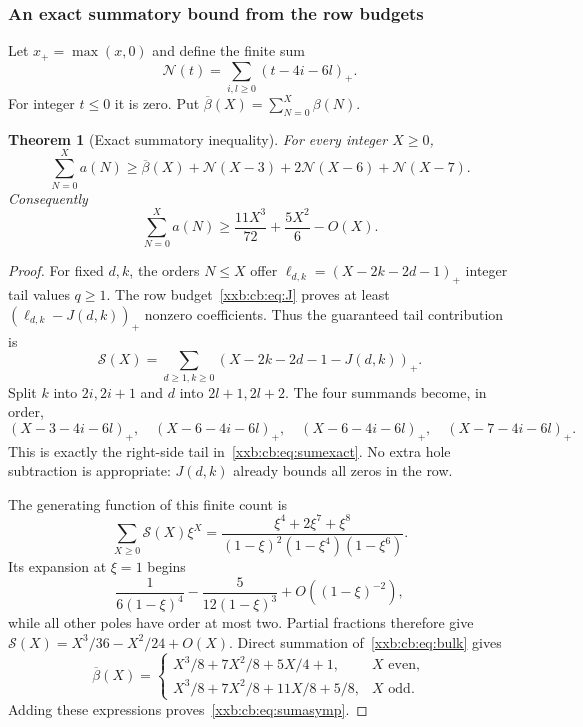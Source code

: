 \documentclass[11pt,a4paper]{article}
\numberwithin{equation}{section}
\newtheorem{theorem}{Theorem}[section]
\theoremstyle{definition}
\theoremstyle{remark}
\theoremstyle{plain}
\begin{document}
\subsubsection{An exact summatory bound from the row budgets}

Let $x_+=\max(x,0)$ and define the finite sum
\begin{equation}\label{xxb:cb:eq:F}
 \mathcal N(t)=\sum_{i,l\ge0}(t-4i-6l)_+.
\end{equation}
For integer $t\le0$ it is zero. Put $\overline\beta(X)=\sum_{N=0}^X\beta(N)$.

\begin{theorem}[Exact summatory inequality]\label{xxb:cb:thm:sum}
For every integer $X\ge0$,
\begin{equation}\label{xxb:cb:eq:sumexact}
 \sum_{N=0}^Xa(N)\ge\overline\beta(X)+\mathcal N(X-3)+2\mathcal N(X-6)+\mathcal N(X-7).
\end{equation}
Consequently
\begin{equation}\label{xxb:cb:eq:sumasymp}
 \sum_{N=0}^Xa(N)\ge\frac{11X^3}{72}+\frac{5X^2}{6}-O(X).
\end{equation}
\end{theorem}
\begin{proof}
For fixed $d,k$, the orders $N\le X$ offer
$\ell_{d,k}=(X-2k-2d-1)_+$ integer tail values $q\ge1$. The row
budget~\eqref{xxb:cb:eq:J} proves at least $(\ell_{d,k}-J(d,k))_+$ nonzero
coefficients. Thus the guaranteed tail contribution is
\[
 \mathcal S(X)=\sum_{d\ge1,k\ge0}(X-2k-2d-1-J(d,k))_+.
\]
Split $k$ into $2i,2i+1$ and $d$ into $2l+1,2l+2$. The four summands become, in
order,
\[
 (X-3-4i-6l)_+,\quad (X-6-4i-6l)_+,\quad
 (X-6-4i-6l)_+,\quad (X-7-4i-6l)_+.
\]
This is exactly the right-side tail in~\eqref{xxb:cb:eq:sumexact}. No extra
hole subtraction is appropriate: $J(d,k)$ already bounds all zeros in the row.

The generating function of this finite count is
\begin{equation}\label{xxb:cb:eq:GF}
 \sum_{X\ge0}\mathcal S(X)\xi^X
 =\frac{\xi^4+2\xi^7+\xi^8}{(1-\xi)^2(1-\xi^4)(1-\xi^6)}.
\end{equation}
Its expansion at $\xi=1$ begins
\[
 \frac{1}{6(1-\xi)^4}-\frac{5}{12(1-\xi)^3}
 +O((1-\xi)^{-2}),
\]
while all other poles have order at most two. Partial fractions therefore give
$\mathcal S(X)=X^3/36-X^2/24+O(X)$.
Direct summation of~\eqref{xxb:cb:eq:bulk} gives
\[
 \overline\beta(X)=
 \begin{cases}
 X^3/8+7X^2/8+5X/4+1,&X\text{ even},\\
 X^3/8+7X^2/8+11X/8+5/8,&X\text{ odd}.
 \end{cases}
\]
Adding these expressions proves~\eqref{xxb:cb:eq:sumasymp}.
\end{proof}
\end{document}
